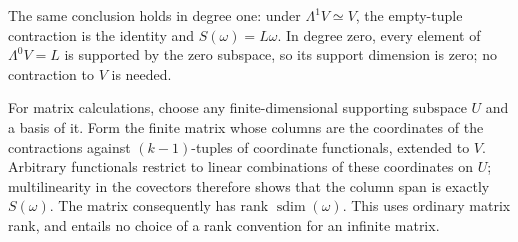 \documentclass[11pt]{amsart}
\theoremstyle{definition}
\theoremstyle{remark}
\numberwithin{equation}{section}
\newcommand{\sdim}{\operatorname{sdim}}
\theoremstyle{plain}
\theoremstyle{definition}
\theoremstyle{plain}
\begin{document}
The same conclusion holds in degree one: under $\Lambda^1V\simeq V$,
the empty-tuple contraction is the identity and $S(\omega)=L\omega$.
In degree zero, every element of $\Lambda^0V=L$ is supported by the
zero subspace, so its support dimension is zero; no contraction to
$V$ is needed.

For matrix calculations, choose any finite-dimensional supporting
subspace $U$ and a basis of it. Form the finite matrix whose columns
are the coordinates of the contractions against $(k-1)$\nobreakdash-tuples
of coordinate functionals, extended to $V$. Arbitrary functionals
restrict to linear combinations of these coordinates on $U$;
multilinearity in the covectors therefore shows that the column span
is exactly $S(\omega)$. The matrix consequently has rank
$\sdim(\omega)$. This uses ordinary matrix rank, and entails no
choice of a rank convention for an infinite matrix.
\end{document}
